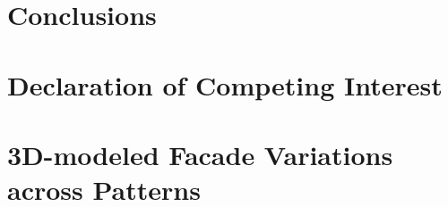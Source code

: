 \documentclass[final,5p,times]{elsarticle}%
\begin{document}
\begin{linenumbers}


\section{Conclusions}
\label{sec:Conclusion}




\section{Declaration of Competing Interest}
\label{sec:DeclarationInterest}


%

\end{linenumbers}




\appendix

\section{3D-modeled Facade Variations across Patterns}
\label{sec:AnnexVariations}

\end{document}

